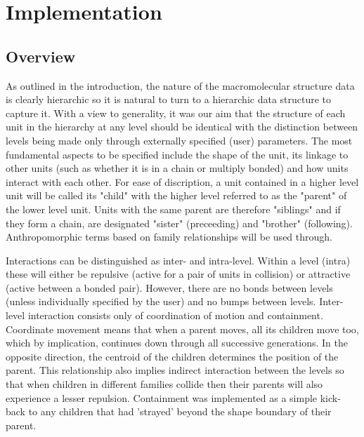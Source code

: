 \section{Implementation}

\subsection{Overview}

As outlined in the introduction, the nature of the macromolecular
structure data is clearly hierarchic so it is natural to turn to a
hierarchic data structure to capture it.  With a view to generality,
it was our aim that the structure of each unit in the hierarchy at 
any level should be identical with the distinction between levels
being made only through externally specified (user) parameters.
The most fundamental aspects to be specified include the shape of
the unit, its linkage to other units (such as whether it is in a
chain or multiply bonded) and how units interact with each other.
For ease of discription, a unit contained in a higher level unit
will be called its "child" with the higher level referred to as
the "parent" of the lower level unit.   Units with the same parent
are therefore "siblings" and if they form a chain, are designated
"sister" (preceeding) and "brother" (following).   Anthropomorphic
terms based on family relationships will be used through.

Interactions can be distinguished as inter- and intra-level.
Within a level (intra) these will either be repulsive (active for
a pair of units in collision) or attractive (active between a
bonded pair).  However, there are no bonds between levels
(unless individually specified by the user) and no bumps between
levels.  Inter-level interaction consists only of coordination of
motion and containment.  Coordinate movement means that when a parent
moves, all its children move too, which by implication, continues
down through all successive generations.  In the opposite direction,
the centroid of the children determines the position of the parent. 
This relationship also implies indirect interaction between the 
levels so that when children in different families collide then
their parents will also experience a lesser repulsion.
Containment was implemented as a simple kick-back to any children
that had 'strayed' beyond the shape boundary of their parent.

